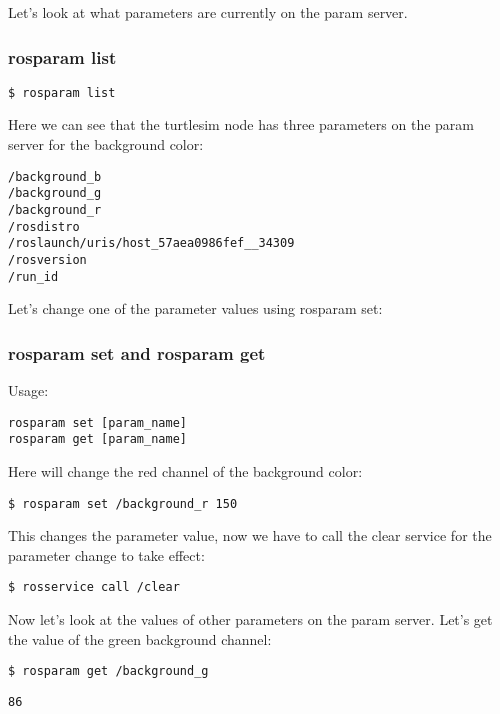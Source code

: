 Let's look at what parameters are currently on the param server.

\subsubsection{rosparam list}

\begin{lstlisting}[breaklines=true languages=bash]
$ rosparam list
\end{lstlisting}

Here we can see that the turtlesim node has three parameters on the param server for the background color:

\begin{lstlisting}[breaklines=true languages=bash]
/background_b
/background_g
/background_r
/rosdistro
/roslaunch/uris/host_57aea0986fef__34309
/rosversion
/run_id
\end{lstlisting}

Let's change one of the parameter values using rosparam set:

\subsubsection{rosparam set and rosparam get}
Usage:
\begin{lstlisting}[breaklines=true languages=bash]
rosparam set [param_name]
rosparam get [param_name]
\end{lstlisting}

Here will change the red channel of the background color:

\begin{lstlisting}[breaklines=true languages=bash]
$ rosparam set /background_r 150
\end{lstlisting}
This changes the parameter value, now we have to call the clear service for the parameter change to take effect:

\begin{lstlisting}[breaklines=true languages=bash]
$ rosservice call /clear
\end{lstlisting}

Now let's look at the values of other parameters on the param server. Let's get the value of the green background channel:

\begin{lstlisting}[breaklines=true languages=bash]
$ rosparam get /background_g 
\end{lstlisting}

\begin{lstlisting}[breaklines=true languages=bash]
86
\end{lstlisting}

